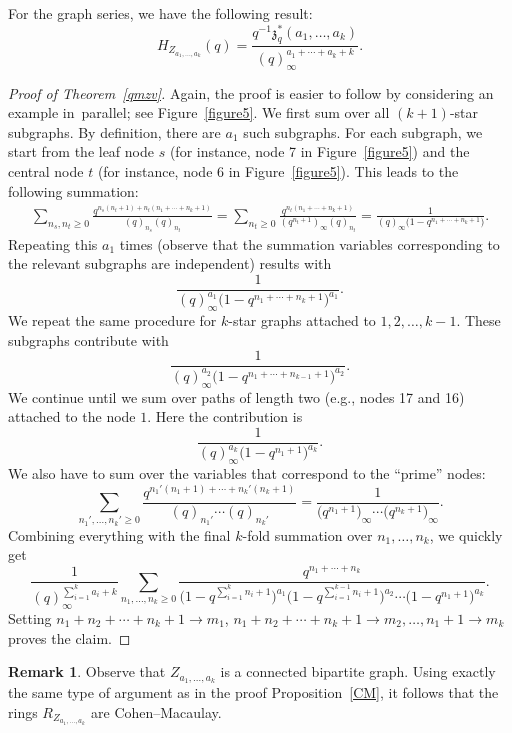 \documentclass[pdftex]{sigma}
\numberwithin{equation}{section}
\theoremstyle{definition}
\newtheorem{Remark}[Theorem]{Remark}
\begin{document}
For the graph series, we have the following result:
\[
H_{Z_{a_1,\dots,a_k}}(q)=\frac{q^{-1}{\mathfrak{z}}^*_q(a_1,\dots,a_k)}{(q)_\infty^{a_1+\cdots +a_k+k}}.
\]
\begin{proof}[Proof of Theorem~\ref{qmzv}]
Again, the proof is easier to follow by considering an example in~parallel; see Figure~\ref{figure5}.
We first sum over all $(k+1)$-star subgraphs. By definition, there are $a_1$ such subgraphs.
For each subgraph, we start from the leaf node $s$ (for instance, node 7 in Figure~\ref{figure5}) and the central node $t$ (for instance, node 6 in Figure~\ref{figure5}).
This leads to the following summation:
\begin{align*}
\sum_{n_s,n_t \geq 0} \frac{q^{n_s(n_t+1)+n_t(n_1+\cdots + n_k+1)}}{(q)_{n_s}(q)_{n_t}}
=\sum_{n_t \geq 0} \frac{q^{n_t(n_1+\cdots + n_k+1)}}{(q^{n_t+1})_\infty (q)_{n_t} }= \frac{1}{(q)_\infty \bigl(1-q^{n_1+\cdots +n_k+1}\bigr)}.
\end{align*}
Repeating this $a_1$ times (observe that the summation variables corresponding to the relevant subgraphs are independent) results with
\[
\frac{1}{(q)^{a_1}_\infty \bigl(1-q^{n_1+\cdots +n_k+1}\bigr)^{a_1}}.
\]
We repeat the same procedure for $k$-star graphs attached to $1,2,\dots,k-1$. These subgraphs contribute with
\[
\frac{1}{(q)^{a_2}_\infty \bigl(1-q^{n_1+\cdots +n_{k-1}+1}\bigr)^{a_2}}.
\]
We continue until we sum over paths of length two (e.g., nodes 17 and 16) attached to the node $1$. Here the contribution is
\[
\frac{1}{(q)^{a_k}_\infty \bigl(1-q^{n_1+1}\bigl)^{a_k}}.
\]
We also have to sum over the variables that correspond to the ``prime'' nodes:
\[
\sum_{ n_1',\dots,n_k' \geq 0} \frac{q^{n_1'(n_1+1)+\cdots + n_k'(n_k+1)}}{(q)_{n_1'} \cdots (q)_{n_k'}}=\frac{1}{\bigl(q^{n_1+1}\bigr)_\infty \cdots \bigl(q^{n_k+1}\bigr)_\infty}.
\]
Combining everything with the final $k$-fold summation over $n_1,\dots,n_k$, we quickly get
\[
\frac{1}{(q)_\infty^{\sum_{i=1}^k a_i+k}} \sum_{n_1,\dots,n_k \geq 0} \frac{q^{n_1+ \cdots + n_k}}{\bigl(1-q^{\sum_{i=1}^{k} n_i+1}\bigr)^{a_1} \bigl(1-q^{\sum_{i=1}^{k-1} n_i+1}\bigr)^{a_2} \cdots \bigl(1-q^{n_1+1}\bigr)^{a_k}}.
\]
Setting $n_1+n_2+\cdots + n_k+1 \to m_1$, $n_1+n_2+\cdots + n_k+1 \to m_2,\dots,n_1+1 \to m_k$ proves the claim.
\end{proof}

\begin{Remark}
Observe that $Z_{a_1,\dots,a_k}$ is a connected bipartite graph. Using exactly the same type of argument as in the proof Proposition~\ref{CM},
it follows that the rings $R_{Z_{a_1,\dots,a_k}}$ are Cohen--Macaulay.
\end{Remark}
\end{document}
